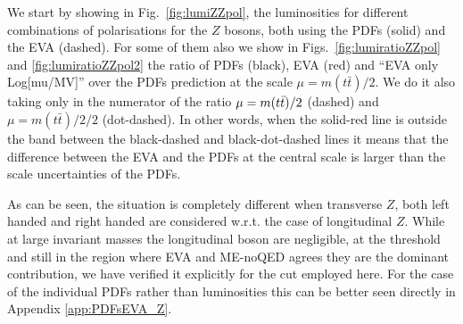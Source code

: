 \documentclass[a4paper,11pt]{article}
\begin{document}
We start by showing in Fig.~\ref{fig:lumiZZpol}, the luminosities for different combinations of polarisations for the $Z$ bosons, both using the PDFs (solid) and the EVA (dashed). For some of them also we show in Figs.~\ref{fig:lumiratioZZpol} and \ref{fig:lumiratioZZpol2} the ratio of PDFs (black), EVA (red) and ``EVA only Log[mu/MV]'' over the PDFs prediction at the scale $\mu=m(t \bar t) /2$. We do it also taking only in the numerator of the ratio  $\mu=m(t \bar t) /2 \time 2$ (dashed) and $\mu=m(t \bar t) /2 / 2$ (dot-dashed). In other words, when the solid-red line is outside the band between the black-dashed and black-dot-dashed lines it means that the difference between the EVA and the PDFs at the central scale is larger than the scale uncertainties of the PDFs.

As can be seen, the situation is completely different when transverse $Z$, both left handed and right handed  are considered w.r.t. the case of longitudinal $Z$. While at large invariant masses the longitudinal boson are negligible, at the threshold and still in the region where EVA and ME-noQED agrees they are the dominant contribution, we have verified it explicitly for the cut employed here. For the case of the individual PDFs rather than luminosities this can be better seen directly in Appendix \ref{app:PDFsEVA_Z}.





 




%
\end{document}
